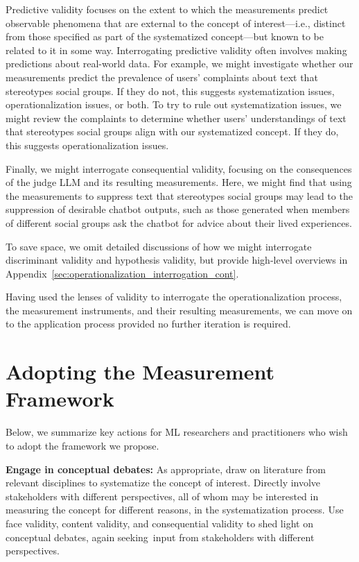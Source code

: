 \documentclass{article}
\begin{document}
Predictive validity focuses on the extent to which the measurements predict observable phenomena that are external to the concept of interest---i.e., distinct from those specified as part of the systematized concept---but known to be related to it in some way. Interrogating predictive validity often involves making predictions about real-world data. For example, we might investigate whether our measurements predict the prevalence of users' complaints about text that stereotypes social groups. If they do not, this suggests systematization issues, operationalization issues, or both. To try to rule out systematization issues, we might review the complaints to determine whether users' understandings of text that stereotypes social groups align with our systematized concept. If they do, this suggests operationalization issues.

Finally, we might interrogate consequential validity, focusing on the consequences of the judge LLM and its resulting measurements. Here, we might find that using the measurements to suppress text that stereotypes social groups may lead to the suppression of desirable chatbot outputs, such as those generated when members of different social groups ask the chatbot for advice about their lived experiences.

To save space, we omit detailed discussions of how we might interrogate discriminant validity and hypothesis validity, but provide high-level overviews in Appendix~\ref{sec:operationalization_interrogation_cont}.

Having used the lenses of validity to interrogate the operationalization process, the measurement instruments, and their resulting measurements, we can move on to the application process provided no further iteration is required.

\section{Adopting the Measurement Framework}
\label{sec:discussion}

Below, we summarize key actions for ML researchers and practitioners who wish to adopt the framework we propose.

\textbf{Engage in conceptual debates:} As appropriate, draw on literature from relevant disciplines to systematize the concept of interest. Directly involve stakeholders with different perspectives, all of whom may be interested in measuring the concept for different reasons, in the systematization process. Use face validity, content validity, and consequential validity to shed light on conceptual debates, again seeking~input from stakeholders with different perspectives.
\end{document}
